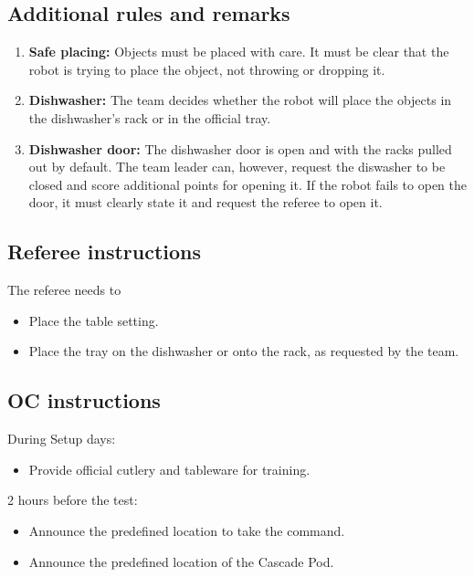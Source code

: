 \subsection{Additional rules and remarks}
\begin{enumerate}[nosep]
	\item \textbf{Safe placing:} Objects must be placed with care. It must be clear that the robot is trying to place the object, not throwing or dropping it.

	\item \textbf{Dishwasher:} The team decides whether the robot will place the objects in the dishwasher's rack or in the official tray.

	\item \textbf{Dishwasher door:} The dishwasher door is open and with the racks pulled out by default.
	The team leader can, however, request the diswasher to be closed and score additional points for opening it. If the robot fails to open the door, it must clearly state it and request the referee to open it.

\end{enumerate}

\subsection{Referee instructions}

The referee needs to
\begin{itemize}
	\item Place the table setting.
	\item Place the tray on the dishwasher or onto the rack, as requested by the team.
\end{itemize}

\subsection{OC instructions}
During Setup days:
\begin{itemize}
	\item Provide official cutlery and tableware for training.
\end{itemize}

2 hours before the test:
\begin{itemize}
	\item Announce the predefined location to take the command.
	\item Announce the predefined location of the Cascade Pod.
\end{itemize}

% 



